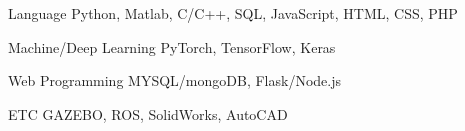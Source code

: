 


\begin{cvskills}


\cvskill
{Language} %
{Python, Matlab, C/C++, SQL, JavaScript, HTML, CSS, PHP} %


\cvskill
{Machine/Deep Learning} %
{PyTorch, TensorFlow,  Keras} %


\cvskill
{Web Programming} %
{MYSQL/mongoDB,  Flask/Node.js} %

\cvskill
{ETC}
{GAZEBO, ROS, SolidWorks, AutoCAD}



\end{cvskills}
